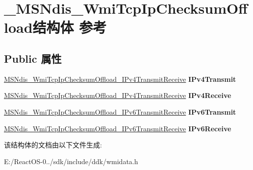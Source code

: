\hypertarget{struct___m_s_ndis___wmi_tcp_ip_checksum_offload}{}\section{\+\_\+\+M\+S\+Ndis\+\_\+\+Wmi\+Tcp\+Ip\+Checksum\+Offload结构体 参考}
\label{struct___m_s_ndis___wmi_tcp_ip_checksum_offload}
\subsection*{Public 属性}
\begin{DoxyCompactItemize}
\item 
\mbox{\label{struct___m_s_ndis___wmi_tcp_ip_checksum_offload_ae7ebf8eb3b0009eece81ef5579f66a0e}} 
\hyperlink{struct___m_s_ndis___wmi_tcp_ip_checksum_offload___i_pv4_transmit_receive}{M\+S\+Ndis\+\_\+\+Wmi\+Tcp\+Ip\+Checksum\+Offload\+\_\+\+I\+Pv4\+Transmit\+Receive} {\bfseries I\+Pv4\+Transmit}
\item 
\mbox{\label{struct___m_s_ndis___wmi_tcp_ip_checksum_offload_a1301363105c5cf4c703c5559e34eca69}} 
\hyperlink{struct___m_s_ndis___wmi_tcp_ip_checksum_offload___i_pv4_transmit_receive}{M\+S\+Ndis\+\_\+\+Wmi\+Tcp\+Ip\+Checksum\+Offload\+\_\+\+I\+Pv4\+Transmit\+Receive} {\bfseries I\+Pv4\+Receive}
\item 
\mbox{\label{struct___m_s_ndis___wmi_tcp_ip_checksum_offload_a4c3a41cd3f1a60fff7ebc5c7e0afde47}} 
\hyperlink{struct___m_s_ndis___wmi_tcp_ip_checksum_offload___i_pv6_transmit_receive}{M\+S\+Ndis\+\_\+\+Wmi\+Tcp\+Ip\+Checksum\+Offload\+\_\+\+I\+Pv6\+Transmit\+Receive} {\bfseries I\+Pv6\+Transmit}
\item 
\mbox{\label{struct___m_s_ndis___wmi_tcp_ip_checksum_offload_a81c8d82e06da7c4276f880ef2e526f92}} 
\hyperlink{struct___m_s_ndis___wmi_tcp_ip_checksum_offload___i_pv6_transmit_receive}{M\+S\+Ndis\+\_\+\+Wmi\+Tcp\+Ip\+Checksum\+Offload\+\_\+\+I\+Pv6\+Transmit\+Receive} {\bfseries I\+Pv6\+Receive}
\end{DoxyCompactItemize}


该结构体的文档由以下文件生成\+:\begin{DoxyCompactItemize}
\item 
E\+:/\+React\+O\+S-\/0../sdk/include/ddk/wmidata.\+h\end{DoxyCompactItemize}
